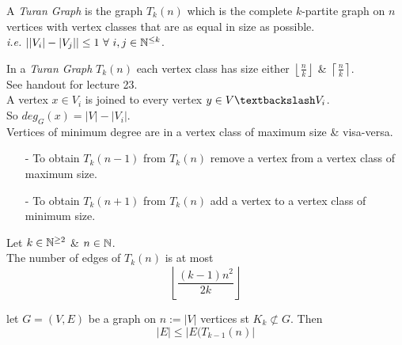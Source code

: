 \documentclass[11pt,a4paper]{article}
\begin{document}
A \textit{Turan Graph} is the graph $T_k(n)$ which is the complete $k$-partite graph on $n$ vertices with vertex classes that are as equal in size as possible.\\
\textit{i.e.} $\left||V_i|-|V_j|\right|\leq1\ \forall\ i,j\in\nats^{\leq k}$.


In a \textit{Turan Graph} $T_k(n)$ each vertex class has size either $\left\lfloor\frac{n}{k}\right\rfloor$ \& $\left\lceil\frac{n}{k}\right\rceil$.\\

See handout for lecture 23.\\%

A vertex $x\in V_i$ is joined to every vertex $y\in V\textbackslash V_i$.\\
So $deg_G(x)=|V|-|V_i|$.\\
\nb Vertices of minimum degree are in a vertex class of maximum size \& visa-versa.\\

\begin{itemize}
	\item[-] To obtain $T_k(n-1)$ from $T_k(n)$ remove a vertex from a vertex class of maximum size.
	\item[-] To obtain $T_k(n+1)$ from $T_k(n)$ add a vertex to a vertex class of minimum size.
\end{itemize}

\theorem{}
Let $k\in\mathbb{N}^{\geq2}$ \& $n\in\mathbb{N}$.\\
The number of edges of $T_{k}(n)$ is at most
$$\left\lfloor\frac{(k-1)n^2}{2k}\right\rfloor$$

let $G=(V,E)$ be a graph on $n:=|V|$ vertices st $K_k\not\subset G$. Then
$$|E|\leq|E(T_{k-1}(n)|$$
\end{document}
